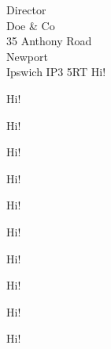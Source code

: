 \documentclass{antique}
\begin{document}
\begin{letter}{Director \\ Doe \& Co \\ 35 Anthony Road
    \\ Newport \\ Ipswich IP3 5RT}
    Hi!

    \clearpage

    Hi!

    \clearpage

    Hi!

    \clearpage

    Hi!

    \clearpage

    Hi!

    \clearpage

    Hi!

    \clearpage

    Hi!

    \clearpage

    Hi!

    \clearpage

    Hi!

    \clearpage

    Hi!

    \clearpage

    Hi!
\end{letter}
\end{document}
